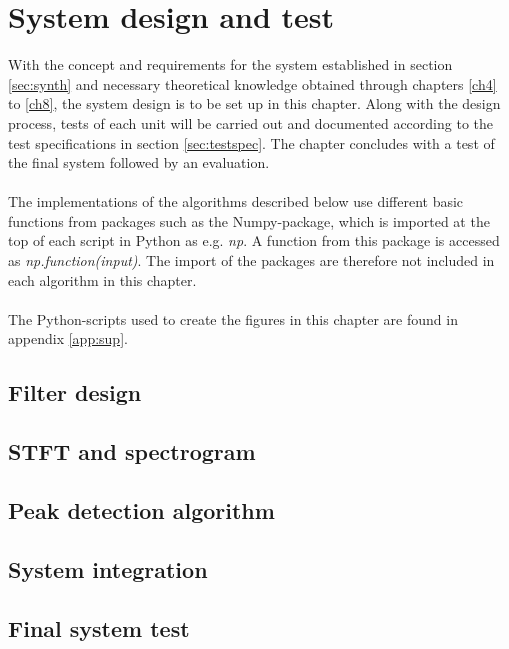 \chapter{System design and test} \label{ch10}
With the concept and requirements for the system established in section \ref{sec:synth} and necessary theoretical knowledge obtained through chapters \ref{ch4} to \ref{ch8}, the system design is to be set up in this chapter. Along with the design process, tests of each unit will be carried out and documented according to the test specifications in section \ref{sec:testspec}. The chapter concludes with a test of the final system followed by an evaluation.
\\ \\
The implementations of the algorithms described below use different basic functions from packages such as the Numpy-package, which is imported at the top of each script in Python as e.g. \textit{np}. A function from this package is accessed as \textit{np.function(input)}. The import of the packages are therefore not included in each algorithm in this chapter.
\\\\
The Python-scripts used to create the figures in this chapter are found in appendix \ref{app:sup}.



\section{Filter design}


\section{STFT and spectrogram}


\section{Peak detection algorithm}


\section{System integration}


\section{Final system test}
